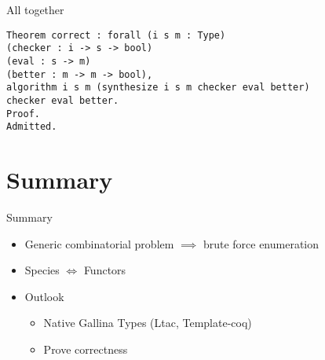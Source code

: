 \documentclass{beamer}
\begin{document}
\begin{frame}[fragile]{All together}
\begin{small}
\begin{verbatim}
Theorem correct : forall (i s m : Type)
(checker : i -> s -> bool) 
(eval : s -> m) 
(better : m -> m -> bool),
algorithm i s m (synthesize i s m checker eval better) 
checker eval better.
Proof.
Admitted.
\end{verbatim}
\end{small}
\end{frame}


\section*{Summary}

\begin{frame}{Summary}
  \begin{itemize}
  \item
		Generic combinatorial problem $\implies$ brute force enumeration
  \item
		Species $\iff$ Functors
  \end{itemize}
  
  \begin{itemize}
  \item
    Outlook
    \begin{itemize}
    \item
			Native Gallina Types (Ltac, Template-coq)
    \item
			Prove correctness
    \end{itemize}
  \end{itemize}
\end{frame}



\end{document}

